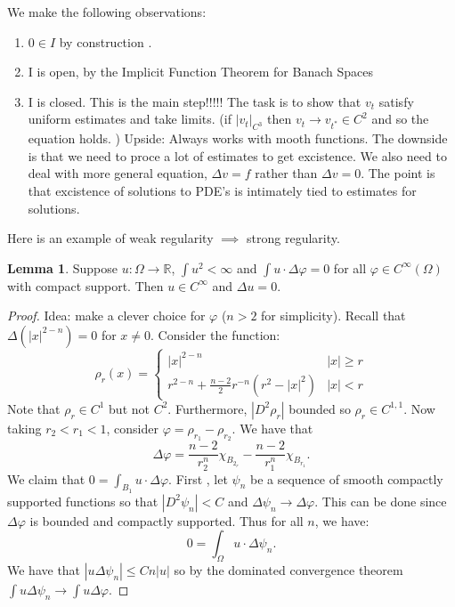 \documentclass[12pt, a4paper]{article}
\theoremstyle{definition}
\newtheorem{lemma}{Lemma}
\newcommand{\R}{\mathbb{R}}                           %
\begin{document}
\begin{tcolorbox}[breakable, colback = white]
\begin{enumerate}[label = \roman*)]
\end{enumerate}
We make the following observations:
\begin{enumerate}[label = \roman*)]
	\item $0\in I$ by construction .
	\item I is open, by the Implicit Function Theorem for Banach Spaces
	\item I is closed. This is the main step!!!!!
		The task is to show that $v_t$ satisfy uniform estimates and take limits. (if $ \left| v_t \right|_{C^3}$ then  $v_t \to v_{t^\ast} \in C^2$ and so the equation holds. )
Upside: Always works with mooth functions. The downside is that we need to proce a lot of estimates to get excistence. We also need to deal with more general equation, 
$\Delta v = f$ rather than $\Delta v = 0$. The point is that excistence of solutions to PDE's is intimately tied to estimates for solutions. 
\end{enumerate}
\end{tcolorbox}
Here is an example of weak regularity $\implies $ strong regularity. 
\begin{tcolorbox}
\begin{lemma}
	Suppose $u: \Omega \to \R$, $\int u^2 < \infty$ and $\int u \cdot \Delta \varphi = 0$ for all $\varphi \in C^\infty(\Omega)$ with compact support. Then $u\in C^\infty$ and $\Delta u = 0$. 
\end{lemma}
\end{tcolorbox}
\begin{proof}
	Idea: make a clever choice for $\varphi$ ($n>2$ for simplicity). Recall that $\Delta \left( |x|^{2-n} \right) = 0$ for $x \neq 0$. Consider the function:
	$$ \rho_r(x) = \begin{cases}
		|x|^{2-n} & |x| \geq r 

		\\
		r^{2-n} + \frac{ n-2 }{ 2 }r^{-n} \left( r^2 - |x|^2 \right) & |x| < r
	\end{cases} $$
	Note that $\rho_r \in C^1$ but not $C^2$. Furthermore, $ \left| D^2 \rho_r \right|$ bounded so $\rho_r \in C^{1,1}$. 
	Now taking $r_2 < r_1 <1$, consider $\varphi= \rho_{r_1} - \rho_{r_2}$. We have that 
	$$ \Delta \varphi = \frac{ n-2 }{ r_2^n  } \chi_{B_{2_r}} - \frac{ n-2 }{ r_1^n }\chi_{B_{r_1}}. $$ 
	We claim that $0 = \int_{B_1} u\cdot  \Delta \varphi $. First , let $\psi_n$ be a sequence of smooth compactly supported functions so that $ \left| D^2 \psi_n \right| <C$ and $\Delta \psi_n \to \Delta \varphi$. This can be done since $\Delta \varphi $ is bounded and compactly supported. 
Thus for all $n$, we have:
$$ 0 = \int_\Omega u \cdot \Delta \psi_n .  $$
We have that $|u \Delta \psi_n 
	|\leq Cn |u|$ so by the dominated convergence theorem $\int u \Delta \psi_n \to \int u \Delta \varphi$. 
\end{proof}
\end{document}
